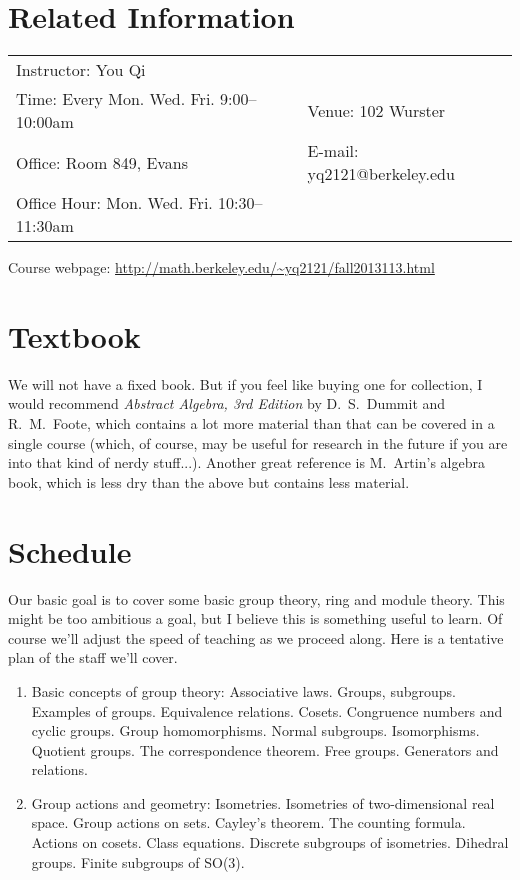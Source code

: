 \documentclass[margin,line]{res}
\begin{document}

\begin{resume}

\section{\sc Related Information}
\vspace{.05in}
\begin{tabular}{@{}p{3.4in}p{4in}}
 Instructor: You Qi            &   \\
Time: Every Mon. Wed. Fri. 9:00--10:00am & Venue: 102 Wurster\\
Office: Room 849, Evans   & E-mail:  yq2121@berkeley.edu \\
Office Hour: Mon. Wed. Fri. 10:30--11:30am & \\
\end{tabular}
Course webpage: \url{http://math.berkeley.edu/~yq2121/fall2013113.html}


\section{\sc Textbook}
We will not have a fixed book. But if you feel like buying one for collection, I would recommend
\emph{Abstract Algebra, 3rd Edition}
by D.~S.~Dummit and R.~M.~Foote, which contains a lot more material than that can be covered in a single course (which, of course, may be useful for research in the future if you are into that kind of nerdy stuff...). Another great reference is M.~Artin's algebra book, which is less dry than the above but contains less material.

\section{\sc Schedule}
Our basic goal is to cover some basic group theory, ring and module theory. This might be too ambitious a goal, but I believe this is something useful to learn. Of course we'll adjust the speed of teaching as we proceed along. Here is a tentative plan of the staff we'll cover.
\begin{enumerate}
\item Basic concepts of group theory: Associative laws. Groups, subgroups. Examples of groups. Equivalence relations. Cosets. Congruence numbers and cyclic groups. Group homomorphisms. Normal subgroups. Isomorphisms. Quotient groups. The correspondence theorem. Free groups. Generators and relations.
\item Group actions and geometry: Isometries. Isometries of two-dimensional real space. Group actions on sets. Cayley's theorem. The counting formula. Actions on cosets. Class equations. Discrete subgroups of isometries. Dihedral groups. Finite subgroups of SO(3).


\end{enumerate}
\end{resume}
\end{document}
